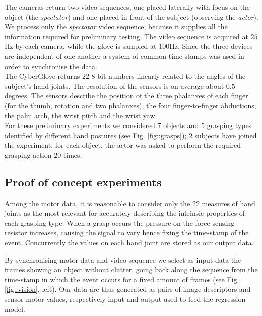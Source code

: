 The cameras return two video sequences, one placed laterally with focus on the object (the \emph{spectator}) and one placed in front of the subject (observing the \emph{actor}). We process only the {\em spectator} video sequence, because it supplies all the information required for preliminary testing. The video sequence is acquired at $25$Hz by each camera, while the glove is sampled at $100$Hz. Since the three devices are independent of one another a system of common time-stamps was used in order to synchronise the data.\\
The CyberGlove returns $22$ $8$-bit numbers linearly related to the angles of the subject's hand joints. The resolution of the sensors is on average about $0.5$ degrees. The sensors describe the position of the three phalanxes of each finger
(for the thumb, rotation and two phalanxes), the four finger-to-finger
abductions, the palm arch, the wrist pitch and the wrist yaw.\\
For these preliminary experiments we considered $7$ objects and $5$ grasping types identified by different hand postures (see Fig. \ref{fig::grasps}); $2$ subjects have joined the experiment: for each object, the actor was asked to perform the required grasping action $20$ times. 

\subsection{Proof of concept experiments}
Among the motor data, it is reasonable to consider only the 22 measures of hand joints as the most relevant for accurately describing the intrinsic properties of each grasping type.
When a grasp occurs the pressure on the force sensing resistor increases, causing the signal to vary hence fixing the time-stamp 
of the event. Concurrently the values on each hand joint are stored as our output data.

By synchronising motor data and video sequence we select as input data the frames showing an object without clutter, going back along the sequence from the time-stamp in which the event occurs for a fixed amount of frames (see Fig. \ref{fig::vision}, left). 
Our data are thus generated as pairs of image descriptors and sensor-motor values, respectively input and output used to feed the regression model. 


